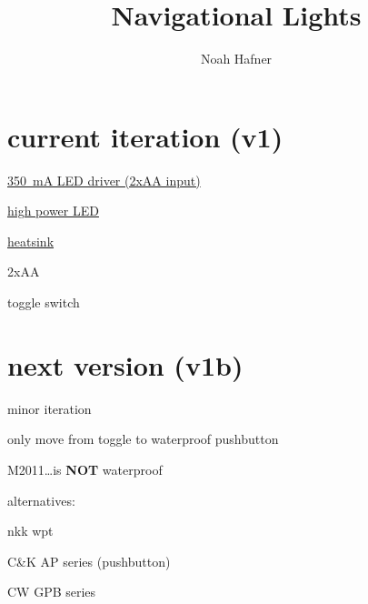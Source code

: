 \documentclass[12pt]{article} %
\title{Navigational Lights}
\author{Noah Hafner}
\author{}
\date{} %
\begin{document}
\maketitle

\section{current iteration (v1)}

\begin{compactitem}
	\item \href{http://www.luxeonstar.com/350mA-Non-Dimmable-MicroPuck-Driver-With-Leads-p/2009a.htm}{\SI{350}{\milli\ampere} LED driver (2xAA input)}
	\item \href{http://www.luxeonstar.com/Green-530nm-20mm-Star-CoolBase-LED-161-lm-p/sr-01-m0100.htm}{high power LED}
	\item \href{http://www.luxeonstar.com/25mm-Square-Alpha-Heat-Sink-p/lpd25-15b.htm}{heatsink}
	\item 2xAA
	\item toggle switch
\end{compactitem}

\section{next version (v1b)}
minor iteration
\begin{compactitem}
	\item only move from toggle to waterproof pushbutton
	\begin{compactitem}
		\item M2011\dots is \textbf{NOT} waterproof
		\item alternatives:
		\begin{compactitem}
			\item nkk wpt
			\item C\&K AP series (pushbutton)
			\item CW GPB series
		\end{compactitem}
	\end{compactitem}
\end{compactitem}

\end{document}
